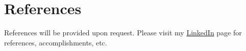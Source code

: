 \documentclass[]{cv-style}                     %
\begin{document}






\section{References}

References will be provided upon request.
Please visit my \href{http://linkedin.com/in/moorara}{LinkedIn} page for references, accomplishments, etc.







\end{document}
